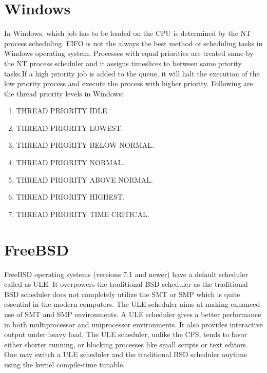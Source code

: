 \documentclass[letterpaper,10pt,titlepage]{IEEEtran}
\begin{document}
\section{Windows}
In Windows, which job has to be loaded on the CPU is determined by the NT process scheduling. FIFO is not the always the best method of scheduling tasks in Windows operating system. Processes with equal priorities are treated same by the NT process scheduler and it assigns timeslices to between same priority tasks.If a high priority job is added to the queue, it will halt the execution of the low priority process and execute the process with higher priority.
Following are the thread priority levels in Windows:\cite{MSDN:online}
\begin{enumerate}
\item THREAD PRIORITY IDLE.
\item THREAD PRIORITY LOWEST. 
\item THREAD PRIORITY BELOW NORMAL.
\item THREAD PRIORITY NORMAL.
\item THREAD PRIORITY ABOVE NORMAL. 
\item THREAD PRIORITY HIGHEST.
\item THREAD PRIORITY TIME CRITICAL. 
\end{enumerate}

\section{FreeBSD}
FreeBSD operating systems (versions 7.1 and newer) have a default scheduler called as ULE. It overpowers the traditional BSD scheduler as the traditional BSD scheduler does not completely utilize the SMT or SMP which is quite essential in the modern computers. The ULE scheduler aims at making enhanced use of SMT and SMP environments. A ULE scheduler gives a better performance in both multiprocessor and uniprocessor environments. It also provides interactive output under heavy load. The ULE scheduler, unlike the CFS, tends to favor either shorter running, or blocking processes like small scripts or text editors. One may switch a ULE scheduler and the traditional BSD scheduler anytime using the kernel compile-time tunable. \cite{ule}  
\end{document}
